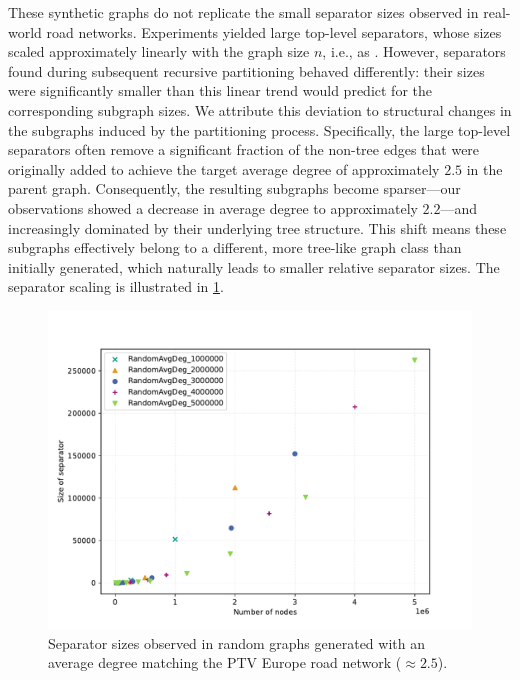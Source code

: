 These synthetic graphs do not replicate the small separator sizes observed in real-world road networks.
Experiments yielded large top-level separators, whose sizes scaled approximately linearly with the graph size \(n\), i.e., as .
However, separators found during subsequent recursive partitioning behaved differently: their sizes were significantly smaller than this linear trend would predict for the corresponding subgraph sizes.
We attribute this deviation to structural changes in the subgraphs induced by the partitioning process.
Specifically, the large top-level separators often remove a significant fraction of the non-tree edges that were originally added to achieve the target average degree of approximately \(2.5\) in the parent graph.
Consequently, the resulting subgraphs become sparser—our observations showed a decrease in average degree to approximately \(2.2\)—and increasingly dominated by their underlying tree structure.
This shift means these subgraphs effectively belong to a different, more tree-like graph class than initially generated, which naturally leads to smaller relative separator sizes.
The separator scaling is illustrated in \cref{fig:same_degree}.



\begin{figure}[tbhp]
    \centering
    \includegraphics[width=0.6\linewidth]{graphics/RandomAvgDeg2.5.pdf}
    \caption{Separator sizes observed in random graphs generated with an average degree matching the PTV Europe road network (\( \approx 2.5 \)).}
    \label{fig:same_degree}
\end{figure}

